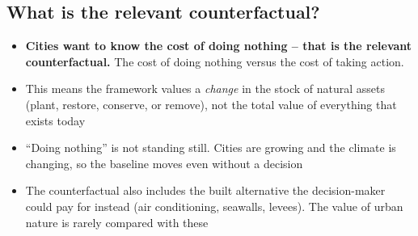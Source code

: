 \documentclass[12pt]{article}
\begin{document}
\subsection{What is the relevant counterfactual?}
\begin{itemize}
  \item \textbf{Cities want to know the cost of doing nothing -- that is the relevant counterfactual.} The cost of doing nothing versus the cost of taking action.
  \item This means the framework values a \textit{change} in the stock of natural assets (plant, restore, conserve, or remove), not the total value of everything that exists today
  \item ``Doing nothing'' is not standing still. Cities are growing and the climate is changing, so the baseline moves even without a decision \citep{fenichelEnvironmentalEcosystemServices2025}
  \item The counterfactual also includes the built alternative the decision-maker could pay for instead (air conditioning, seawalls, levees). The value of urban nature is rarely compared with these \citep{keelerSocialecologicalTechnologicalFactors2019}
\end{itemize}




\end{document}
